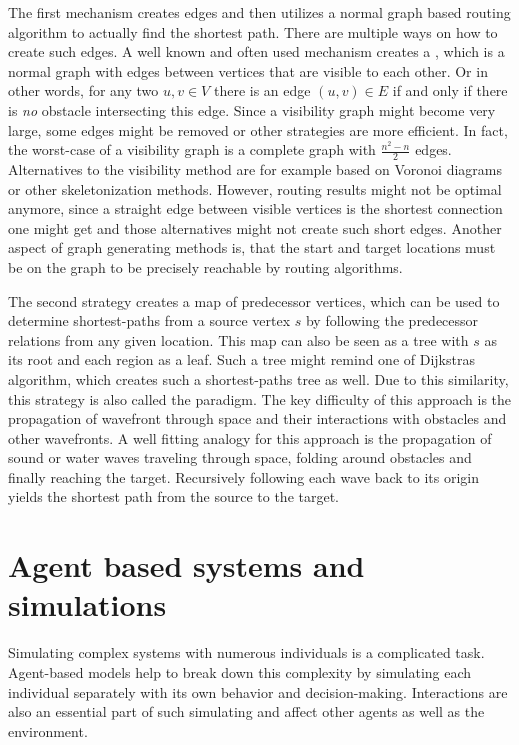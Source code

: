 		The first mechanism creates edges and then utilizes a normal graph based routing algorithm to actually find the shortest path.
		There are multiple ways on how to create such edges.
		A well known and often used mechanism creates a , which is a normal graph with edges between vertices that are visible to each other.
		Or in other words, for any two $u, v \in V$ there is an edge $(u, v) \in E$ if and only if there is \textit{no} obstacle intersecting this edge.
		Since a visibility graph might become very large, some edges might be removed or other strategies are more efficient.
		In fact, the worst-case of a visibility graph is a complete graph with $\frac{n^2 - n}{2}$ edges.
		Alternatives to the visibility method are for example based on Voronoi diagrams or other skeletonization methods\cite[219-220]{graser-osm-open-spaces}.
		However, routing results might not be optimal anymore, since a straight edge between visible vertices is the shortest connection one might get and those alternatives might not create such short edges\cite[223]{graser-osm-open-spaces}.
		Another aspect of graph generating methods is, that the start and target locations must be on the graph to be precisely reachable by routing algorithms.
		
		The second strategy creates a map of predecessor vertices, which can be used to determine shortest-paths from a source vertex $s$ by following the predecessor relations from any given location.
		This map can also be seen as a tree with $s$ as its root and each region as a leaf.
		Such a tree might remind one of Dijkstras algorithm, which creates such a shortest-paths tree as well.
		Due to this similarity, this strategy is also called the  paradigm\cite[648]{mitchell-discrete-geodesic}.
		The key difficulty of this approach is the propagation of wavefront through space and their interactions with obstacles and other wavefronts\cite[3]{hershberger-suri}.
		A well fitting analogy for this approach is the propagation of sound or water waves traveling through space, folding around obstacles and finally reaching the target.
		Recursively following each wave back to its origin yields the shortest path from the source to the target.

\section{Agent based systems and simulations}

	Simulating complex systems with numerous individuals is a complicated task.
	Agent-based models help to break down this complexity by simulating each individual separately with its own behavior and decision-making. \cite{macal2014introductory}
	Interactions are also an essential part of such simulating and affect other agents as well as the environment.
	
